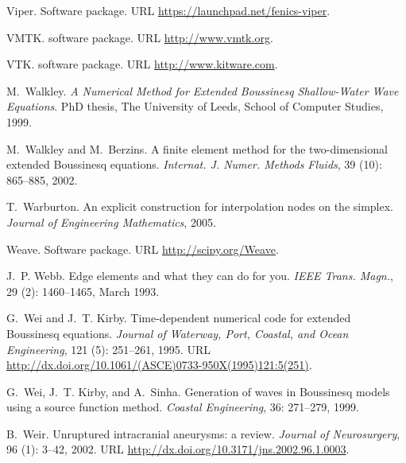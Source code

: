 \begin{thebibliography}{467}
Viper.
\newblock Software package.
\newblock URL \url{https://launchpad.net/fenics-viper}.

VMTK.
\newblock software package.
\newblock URL \url{http://www.vmtk.org}.

VTK.
\newblock software package.
\newblock URL \url{http://www.kitware.com}.

M.~Walkley.
\newblock \emph{A Numerical Method for Extended {B}oussinesq Shallow-Water Wave
  Equations}.
\newblock PhD thesis, The University of Leeds, School of Computer Studies,
  1999.

M.~Walkley and M.~Berzins.
\newblock A finite element method for the two-dimensional extended {B}oussinesq
  equations.
\newblock \emph{Internat. J. Numer. Methods Fluids}, 39 (10):
  865--885, 2002.

T.~Warburton.
\newblock An explicit construction for interpolation nodes on the simplex.
\newblock \emph{Journal of Engineering Mathematics}, 2005.

Weave.
\newblock Software package.
\newblock URL \url{http://scipy.org/Weave}.

J.~P. Webb.
\newblock Edge elements and what they can do for you.
\newblock \emph{IEEE Trans. Magn.}, 29 (2): 1460--1465, March
  1993.

G.~Wei and J.~T. Kirby.
\newblock Time-dependent numerical code for extended {B}oussinesq equations.
\newblock \emph{Journal of Waterway, Port, Coastal, and Ocean Engineering},
  121 (5): 251--261, 1995.
\newblock URL \url{http://dx.doi.org/10.1061/(ASCE)0733-950X(1995)121:5(251)}.

G.~Wei, J.~T. Kirby, and A.~Sinha.
\newblock Generation of waves in {B}oussinesq models using a source function
  method.
\newblock \emph{Coastal Engineering}, 36: 271--279, 1999.

B.~Weir.
\newblock Unruptured intracranial aneurysms: a review.
\newblock \emph{Journal of Neurosurgery}, 96 (1): 3--42,
  2002.
\newblock URL \url{http://dx.doi.org/10.3171/jns.2002.96.1.0003}.


\end{thebibliography}
